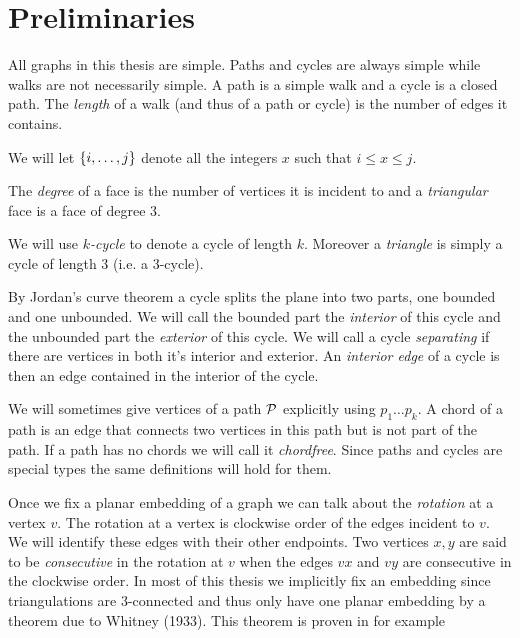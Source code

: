 
\section{Preliminaries}
All graphs in this thesis are simple. Paths and cycles are always simple while walks are not necessarily simple. A path is a simple walk and a cycle is a closed path.
The \emph{length} of a walk (and thus of a path or cycle) is the number of edges it contains.

We will let $\braces {i, \ldots, j}$ denote all the integers $x$ such that $i \leq x \leq j$.

The \emph{degree} of a face is the number of vertices it is incident to and a \emph{triangular} face is a face of degree $3$.

We will use \emph{$k$-cycle} to denote a cycle of length $k$. Moreover a \emph{triangle} is simply a cycle of length $3$ (i.e. a $3$-cycle).

By Jordan's curve theorem a cycle splits the plane into two parts, one bounded and one unbounded. We will call the bounded part the \emph{interior} of this cycle and the unbounded part the \emph{exterior} of this cycle.
We will call a cycle \emph{separating} if there are vertices in both it's interior and exterior.
An \emph{interior edge} of a cycle is then an edge contained in the interior of the cycle.


We will sometimes give vertices of a path $\P$ explicitly using $p_1 \ldots p_k$. A chord of a path is an edge that connects two vertices in this path but is not part of the path. If a path has no chords we will call it \emph{chordfree}. Since paths and cycles are special types the same definitions will hold for them.

Once we fix a planar embedding of a graph we can talk about the \emph{rotation} at a vertex $v$. The rotation at a vertex is clockwise order of the edges incident to $v$. We will identify these edges with their other endpoints. Two vertices $x, y$ are said to be \emph{consecutive} in the rotation at $v$ when the edges $vx$ and $vy$ are consecutive in the clockwise order. In most of this thesis we implicitly fix an embedding since triangulations are 3-connected and thus only have one planar embedding by a theorem due to Whitney (1933). This theorem is proven in for example \cite[p. 267]{Bondy2008}

